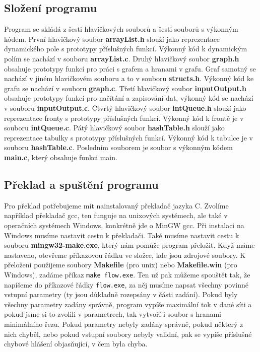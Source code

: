 \documentclass[12pt,a4paper]{article}
\begin{document}
	 \subsection{Složení programu}
	 Program se skládá z šesti hlavičkových souborů a šesti souborů s výkonným kódem. První hlavičkový soubor \textbf{arrayList.h} slouží jako reprezentace dynamického pole s prototypy příslušných funkcí. Výkonný kód k dynamickým polím se nachází v souboru \textbf{arrayList.c}. Druhý hlavičkový soubor \textbf{graph.h} obsahuje prototypy funkcí pro práci s grafem a hranami v grafu. Graf samotný se nachází v jiném hlavičkovém souboru a to v souboru \textbf{structs.h}. Výkonný kód ke grafu se nachází v souboru \textbf{graph.c}.  Třetí hlavičkový soubor \textbf{inputOutput.h} obsahuje prototypy funkcí pro načítání a zapisování dat, výkonný kód se nachází v souboru \textbf{inputOutput.c}. Čtvrtý hlavičkový soubor \textbf{intQueue.h} slouží jako reprezentace fronty s prototypy příslušných funkcí. Výkonný kód k frontě je v souboru \textbf{intQueue.c}. Pátý hlavičkový soubor \textbf{hashTable.h} slouží jako reprezentace tabulky s prototypy příslušných funkcí. Výkonný kód k tabulce je v souboru \textbf{hashTable.c}. Posledním souborem je soubor s výkonným kódem \textbf{main.c}, který obsahuje funkci main.
	 \subsection{Překlad a spuštění programu}
	 Pro překlad potřebujeme mít nainstalovaný překladač jazyka C. Zvolíme například překladač gcc, ten funguje na unixových systémech, ale také v operačních systémech Windows, konkrétně jde o MinGW gcc. Při instalaci na Windows musíme nastavit cestu k překladači. Také musíme nastavit cestu k souboru \textbf{mingw32-make.exe}, který nám pomůže program přeložit. Když máme nastaveno, otevřeme příkazovou řádku ve složce, kde jsou zdrojové soubory. K přeložení použijeme soubory \textbf{Makefile} (pro unix) nebo \textbf{Makefile.win} (pro Windows), zadáme příkaz \texttt{make flow.exe}. Ten už pak můžeme spouštět tak, že napíšeme do příkazové řádky \texttt{flow.exe}, za něj musíme napsat všechny povinné vstupní parametry (ty jsou důkladně rozepsány v části zadání). Pokud byly všechny parametry zadány správně, program vypíše maximální tok v dané síti a pokud jsme si to zvolili v parametrech, tak vytvoří i soubor s hranami minimálního řezu. Pokud parametry nebyly zadány správně, pokud některý z nich chyběl, nebo pokud vstupní soubory nebyly validní, pak se vypíše příslušné chybové hlášení objasňující, v čem byla chyba.
\end{document}

